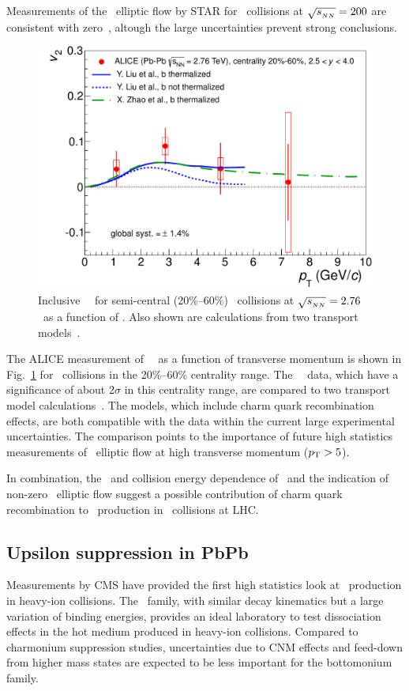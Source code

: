 Measurements of the \jpsi\ elliptic flow by STAR for \AuAu\ collisions at $\sqrt{s_{_{NN}}} = 200$\GeV
are consistent with zero~\cite{Adamczyk:2012pw}, altough the large uncertainties prevent strong conclusions.
\begin{figure}
\begin{center}
\includegraphics[width=0.49\linewidth]{qqbarfigures/prl_fig4-eps-converted-to.pdf}
\caption{\label{fig:GR:v2ptcomp} Inclusive \jpsi\ \vtwo\
for semi-central (20\%--60\%) \PbPb\ collisions at $\sqrt{s_{_{NN}}} = 2.76$\TeV\ as a function of \pT.
Also shown are calculations from two transport models~\cite{Liu:2009gx,Zhao:2012gc}.}
\end{center}
\end{figure}
The ALICE measurement of \jpsi\ \vtwo\ as a function of transverse momentum is shown in Fig.~\ref{fig:GR:v2ptcomp} for \PbPb\ collisions
in the 20\%--60\% centrality range.
The \jpsi\ \vtwo\ data, which have a significance of about 2$\sigma$ in this centrality range, are compared to two
transport model calculations~\cite{Liu:2009gx,Zhao:2012gc}. The models, which include charm quark recombination effects,
are both compatible with the data within the current large experimental uncertainties. The comparison points to the
importance of future high statistics measurements of \jpsi\ elliptic flow at high transverse momentum ($\mbox{$p_{\mathrm{T}}$} > 5$\GeVc).

In combination, the \pT\ and collision energy dependence of \jpsi \Raa\ and the indication of non-zero \jpsi\ elliptic
flow suggest a possible  contribution of charm quark recombination to \jpsi\ production in \PbPb\ collisions
at LHC.

\subsection{Upsilon suppression in PbPb}

Measurements by CMS have provided the first high statistics look at \PgU\ production in heavy-ion collisions.
The \PgU\ family, with similar decay kinematics but a large variation of binding energies,
provides an ideal laboratory to test dissociation effects in the hot medium produced in
heavy-ion collisions. Compared to charmonium suppression studies, uncertainties due
to CNM effects and feed-down from higher mass states are expected to be
less important for the bottomonium family.

